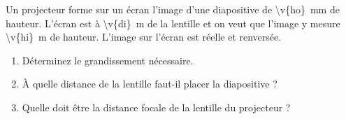 Un projecteur forme sur un écran l'image d'une diapositive de \qty{\v{ho}}{mm} de hauteur. L'écran est à \qty{\v{di}}{m} de la lentille et on veut que l'image y mesure \qty{\v{hi}}{m} de hauteur. L'image sur l'écran est réelle et renversée.

\begin{enumerate}[label=\alph*)]
    \item Déterminez le grandissement nécessaire.
    \item À quelle distance de la lentille faut-il placer la diapositive ?
    \item Quelle doit être la distance focale de la lentille du projecteur ?
\end{enumerate}
